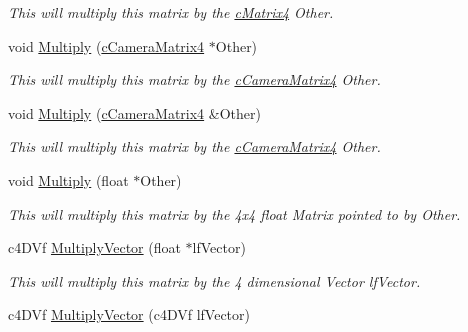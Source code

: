 \begin{DoxyCompactItemize}
\begin{DoxyCompactList}\small\item\em This will multiply this matrix by the \hyperlink{classc_matrix4}{cMatrix4} Other. \end{DoxyCompactList}\item 
\hypertarget{classc_matrix4_a4eddb15044110cb20c1fa8df80bf1e05}{
void \hyperlink{classc_matrix4_a4eddb15044110cb20c1fa8df80bf1e05}{Multiply} (\hyperlink{classc_camera_matrix4}{cCameraMatrix4} $\ast$Other)}
\label{classc_matrix4_a4eddb15044110cb20c1fa8df80bf1e05}

\begin{DoxyCompactList}\small\item\em This will multiply this matrix by the \hyperlink{classc_camera_matrix4}{cCameraMatrix4} Other. \end{DoxyCompactList}\item 
\hypertarget{classc_matrix4_a8cd8d9304a6bc454d635c2e37f340fa7}{
void \hyperlink{classc_matrix4_a8cd8d9304a6bc454d635c2e37f340fa7}{Multiply} (\hyperlink{classc_camera_matrix4}{cCameraMatrix4} \&Other)}
\label{classc_matrix4_a8cd8d9304a6bc454d635c2e37f340fa7}

\begin{DoxyCompactList}\small\item\em This will multiply this matrix by the \hyperlink{classc_camera_matrix4}{cCameraMatrix4} Other. \end{DoxyCompactList}\item 
\hypertarget{classc_matrix4_a67be2f0c0552a8c88ccd25e6fe4c3e4e}{
void \hyperlink{classc_matrix4_a67be2f0c0552a8c88ccd25e6fe4c3e4e}{Multiply} (float $\ast$Other)}
\label{classc_matrix4_a67be2f0c0552a8c88ccd25e6fe4c3e4e}

\begin{DoxyCompactList}\small\item\em This will multiply this matrix by the 4x4 float Matrix pointed to by Other. \end{DoxyCompactList}\item 
\hypertarget{classc_matrix4_a48bd924892489442e2b123f9748b2fd4}{
c4DVf \hyperlink{classc_matrix4_a48bd924892489442e2b123f9748b2fd4}{MultiplyVector} (float $\ast$lfVector)}
\label{classc_matrix4_a48bd924892489442e2b123f9748b2fd4}

\begin{DoxyCompactList}\small\item\em This will multiply this matrix by the 4 dimensional Vector lfVector. \end{DoxyCompactList}\item 
\hypertarget{classc_matrix4_a0ea7f1ee83288bfc09db32d5939f18b1}{
c4DVf \hyperlink{classc_matrix4_a0ea7f1ee83288bfc09db32d5939f18b1}{MultiplyVector} (c4DVf lfVector)}
\label{classc_matrix4_a0ea7f1ee83288bfc09db32d5939f18b1}


\end{DoxyCompactItemize}
